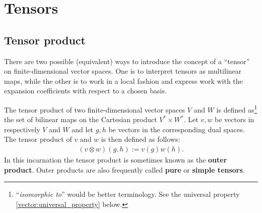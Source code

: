 \section{Tensors}\label{section:tensors}
\subsection{Tensor product}

    There are two possible (equivalent) ways to introduce the concept of a ``tensor'' on finite-dimensional vector spaces. One is to interpret tensors as multilinear maps, while the other is to work in a local fashion and express work with the expansion coefficients with respect to a chosen basis.

    \begin{definition}\label{vector:tensor_product}
        The tensor product of two finite-dimensional vector spaces $V$ and $W$ is defined as\footnote{``\textit{isomorphic to}'' would be better terminology. See the universal property \ref{vector:universal_property} below.} the set of bilinear maps on the Cartesian product $V^*\times W^*$. Let $v,w$ be vectors in respectively $V$ and $W$ and let $g,h$ be vectors in the corresponding dual spaces. The tensor product of $v$ and $w$ is then defined as follows:
        \begin{gather}
            (v\otimes w)(g,h) := v(g)w(h).
        \end{gather}
        In this incarnation the tensor product is sometimes known as the \textbf{outer product}. Outer products are also frequently called \textbf{pure} or \textbf{simple tensors}.
    \end{definition}

